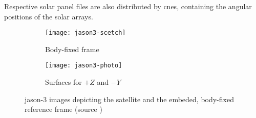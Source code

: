 Respective solar panel files are also distributed by \gls{cnes}, containing the 
angular positions of the solar arrays.

\begin{figure}
    \centering
    \begin{subfigure}[b]{0.45\textwidth}
      \centering
      \texttt{[image: jason3-scetch]}
      \caption{Body-fixed frame}
      \label{fig:jason3-scetch}
    \end{subfigure}
    \begin{subfigure}[b]{0.45\textwidth}
      \centering
      \texttt{[image: jason3-photo]}
      \caption{Surfaces for $+Z$ and $-Y$}
      \label{fig:jason3-photo}
    \end{subfigure}
    \caption{\gls{jason}-3 images depicting the satellite and the embeded, 
      body-fixed reference frame (source \cite{Couderc2015})}
    \label{fig:jason3-view}
\end{figure}
